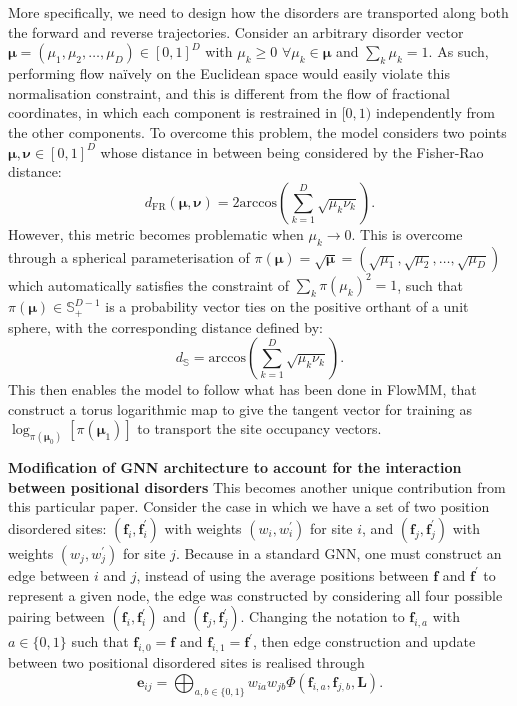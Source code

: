 \begin{myquote}
\hspace{10pt} More specifically, we need to design how the disorders are transported along both the forward and reverse trajectories. Consider an arbitrary disorder vector $\boldsymbol{\mu}=(\mu_1,\mu_2,\ldots,\mu_D)\in[0,1]^D$ with $\mu_k\geq 0$ $\forall \mu_k\in\boldsymbol{\mu}$ and $\sum_k\mu_k=1$. As such, performing flow na\"{i}vely on the Euclidean space would easily violate this normalisation constraint, and this is different from the flow of fractional coordinates, in which each component is restrained in $[0,1)$ independently from the other components. To overcome this problem, the model considers two points $\boldsymbol{\mu},\boldsymbol{\nu}\in [0,1]^D$ whose distance in between being considered by the Fisher-Rao distance:
\begin{equation*}
    d_{\mathrm{FR}}(\boldsymbol{\mu},\boldsymbol{\nu})=2\mathrm{arccos}\left(\sum_{k=1}^D\sqrt{\mu_k\nu_k}\right).
\end{equation*}
However, this metric becomes problematic when $\mu_k\to0$. This is overcome through a spherical parameterisation of $\pi(\boldsymbol{\mu})=\sqrt{\boldsymbol{\mu}}=(\sqrt{\mu_1},\sqrt{\mu_2},\ldots,\sqrt{\mu_D})$ which automatically satisfies the constraint of $\sum_k\pi(\mu_k)^2=1$, such that $\pi(\boldsymbol{\mu})\in\mathbb{S}_{+}^{D-1}$ is a probability vector ties on the positive orthant of a unit sphere, with the corresponding distance defined by:
\begin{equation*}
    d_{\mathbb{S}}=\mathrm{arccos}\left( \sum_{k=1}^D\sqrt{\mu_k\nu_k}\right).
\end{equation*}
This then enables the model to follow what has been done in FlowMM, that construct a torus logarithmic map to give the tangent vector for training as $\log_{\pi(\boldsymbol{\mu}_0)}[\pi(\boldsymbol{\mu}_1)]$ to transport the site occupancy vectors.

\hspace{10pt} \textbf{Modification of GNN architecture to account for the interaction between positional disorders} This becomes another unique contribution from this particular paper. Consider the case in which we have a set of two position disordered sites: $(\bm{f}_i,\bm{f}^\prime_i)$ with weights $(w_i,w_i^\prime)$ for site $i$, and $(\bm{f}_j,\bm{f}^\prime_j)$ with weights $(w_j,w_j^\prime)$ for site $j$. Because in a standard GNN, one must construct an edge between $i$ and $j$, instead of using the average positions between $\bm{f}$ and $\bm{f}^\prime$ to represent a given node, the edge was constructed by considering all four possible pairing between $(\bm{f}_i,\bm{f}^\prime_i)$ and $(\bm{f}_j,\bm{f}^\prime_j)$. Changing the notation to $\bm{f}_{i,a}$ with $a\in\{0,1\}$ such that $\bm{f}_{i,0}=\bm{f}$ and $\bm{f}_{i,1}=\bm{f}^\prime$, then edge construction and update between two positional disordered sites is realised through
\begin{equation*}
    \bm{e}_{ij}=\bigoplus_{a,b\in\{0,1\}}w_{ia}w_{jb}\Phi(\bm{f}_{i,a},\bm{f}_{j,b},\bm{L}).
\end{equation*}



\end{myquote}